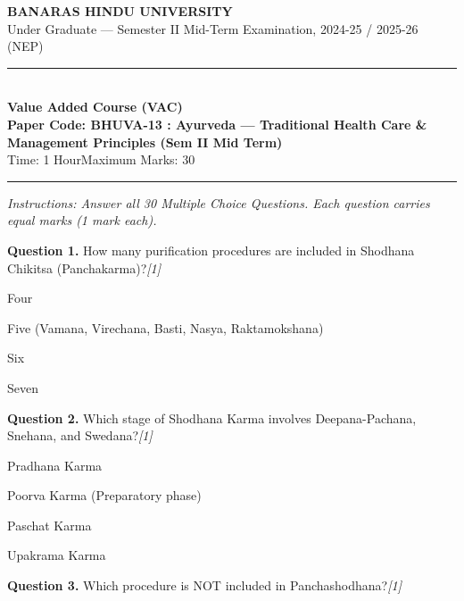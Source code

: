\documentclass[11pt,a4paper]{article}
\newcommand{\pts}[1]{\hfill   \textit{[#1]}}
\begin{document}
\begin{center}
  {\large\bfseries BANARAS HINDU UNIVERSITY}\\[2pt]
  {\normalsize Under Graduate --- Semester II Mid-Term Examination, 2024-25 / 2025-26 (NEP)}\\[6pt]
  \rule{0.8\linewidth}{0.5pt}\\[6pt]
  {\large\bfseries Value Added Course (VAC)}\\[4pt]
  {\large\bfseries Paper Code: BHUVA-13 : Ayurveda --- Traditional Health Care \& Management Principles (Sem II Mid Term)}\\[4pt]
  {\normalsize Time: 1 Hour\hfill Maximum Marks: 30}
\end{center}

\rule{\linewidth}{0.4pt}

\smallskip



\noindent   \textit{Instructions: Answer all 30 Multiple Choice Questions. Each question carries equal marks (1 mark each).}

\bigskip




\noindent   \textbf{Question 1.} How many purification procedures are included in Shodhana Chikitsa (Panchakarma)?\pts{1}

\begin{parts}
  \item Four
  \item Five (Vamana, Virechana, Basti, Nasya, Raktamokshana)
  \item Six
  \item Seven
\end{parts}

\medskip




\noindent   \textbf{Question 2.} Which stage of Shodhana Karma involves Deepana-Pachana, Snehana, and Swedana?\pts{1}

\begin{parts}
  \item Pradhana Karma
  \item Poorva Karma (Preparatory phase)
  \item Paschat Karma
  \item Upakrama Karma
\end{parts}

\medskip




\noindent   \textbf{Question 3.} Which procedure is NOT included in Panchashodhana?\pts{1}
\end{document}
